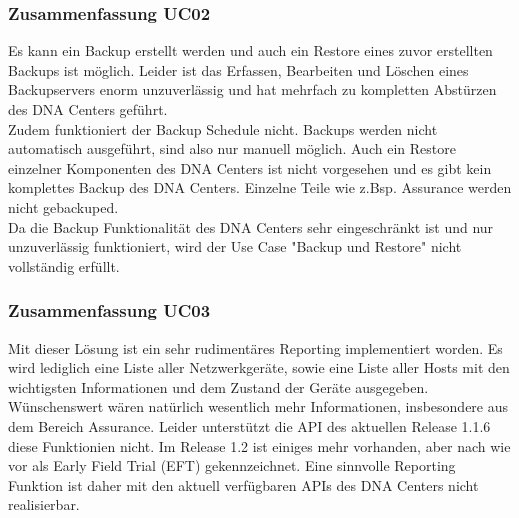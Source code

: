 \begin{landscape}
\subsubsection{Zusammenfassung UC02}
Es kann ein Backup erstellt werden und auch ein Restore eines zuvor erstellten Backups ist möglich. Leider ist das Erfassen, Bearbeiten und Löschen eines Backupservers enorm unzuverlässig und hat mehrfach zu kompletten Abstürzen des DNA Centers geführt. \\
Zudem funktioniert der Backup Schedule nicht. Backups werden nicht automatisch ausgeführt, sind also nur manuell möglich. Auch ein Restore einzelner Komponenten des DNA Centers ist nicht vorgesehen und es gibt kein komplettes Backup des DNA Centers. Einzelne Teile wie z.Bsp. Assurance werden nicht gebackuped. \\
Da die Backup Funktionalität des DNA Centers sehr eingeschränkt ist und nur unzuverlässig funktioniert, wird der Use Case "Backup und Restore" nicht vollständig erfüllt.
\pagebreak


\subsubsection{Zusammenfassung UC03}
Mit dieser Lösung ist ein sehr rudimentäres Reporting implementiert worden. Es wird lediglich eine Liste aller Netzwerkgeräte, sowie eine Liste aller Hosts mit den wichtigsten Informationen und dem Zustand der Geräte ausgegeben. Wünschenswert wären natürlich wesentlich mehr Informationen, insbesondere aus dem Bereich Assurance. Leider unterstützt die API des aktuellen Release 1.1.6 diese Funktionien nicht. Im Release 1.2 ist einiges mehr vorhanden, aber nach wie vor als Early Field Trial (EFT) gekennzeichnet. 
Eine sinnvolle Reporting Funktion ist daher mit den aktuell verfügbaren APIs des DNA Centers nicht realisierbar.
\pagebreak


\end{landscape}
